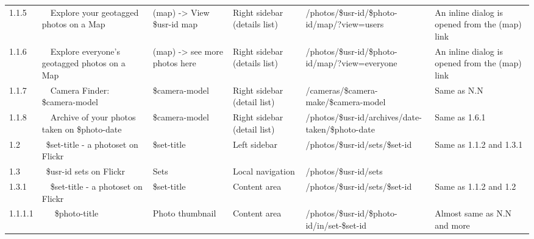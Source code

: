 \documentclass[12pt,a4paper]{article}
\begin{document}
\begin{landscape}
\begin{table}[h!b!p!]
\begin{center}
\begin{tiny}
\begin{tabular}{l|l|l|l|l|p{3cm}}
                1.1.5 &
                ~~Explore your geotagged photos on a Map &
                (map) -> View \$usr-id map &
                Right sidebar (details list) &
                /photos/\$usr-id/\$photo-id/map/?view=users &
                An inline dialog is opened from the (map) link \\

                1.1.6 &
                ~~Explore everyone's geotagged photos on a Map &
                (map) -> see more photos here &
                Right sidebar (details list) &
                /photos/\$usr-id/\$photo-id/map/?view=everyone &
                An inline dialog is opened from the (map) link \\

                1.1.7 &
                ~~Camera Finder: \$camera-model &
                \$camera-model &
                Right sidebar (detail list) &
                /cameras/\$camera-make/\$camera-model &
                Same as N.N \\

                1.1.8 &
                ~~Archive of your photos taken on \$photo-date &
                \$camera-model &
                Right sidebar (detail list) &
                /photos/\$usr-id/archives/date-taken/\$photo-date &
                Same as 1.6.1 \\

              1.2 &
              ~\$set-title - a photoset on Flickr &
              \$set-title &
              Left sidebar &
              /photos/\$usr-id/sets/\$set-id &
              Same as 1.1.2 and 1.3.1 \\

              1.3 &
              ~\$usr-id sets on Flickr &
              Sets &
              Local navigation &
              /photos/\$usr-id/sets &
              \\

                1.3.1 &
                ~~\$set-title - a photoset on Flickr &
                \$set-title &
                Content area &
                /photos/\$usr-id/sets/\$set-id &
                Same as 1.1.2 and 1.2 \\

                  1.1.1.1 &
                  ~~~\$photo-title &
                  Photo thumbnail &
                  Content area &
                  /photos/\$usr-id/\$photo-id/in/set-\$set-id &
                  Almost same as N.N and more\\



\end{tabular}
\end{tiny}
\end{center}
\end{table}
\end{landscape}
\end{document}

